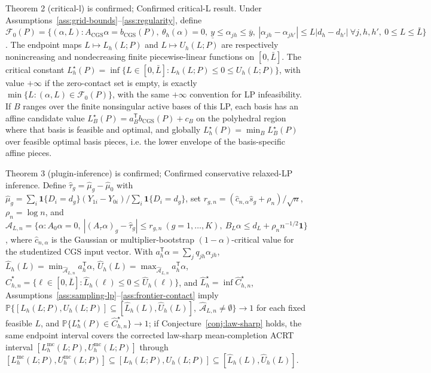 \documentclass[11pt]{article}
\renewcommand{\Pr}{\mathbb{P}}
\newcommand{\one}{\mathbf{1}}
\newcommand{\transpose}{\mathsf{T}}
\theoremstyle{definition}
\theoremstyle{plain}
\theoremstyle{remark}
\begin{document}
Theorem 2 (critical-l) is confirmed; Confirmed critical-L result. Under Assumptions~\ref{ass:grid-bounds}--\ref{ass:regularity}, define \(\mathcal F_0(P)=\{(\alpha,L):A_{\mathrm{CGS}}\alpha=b_{\mathrm{CGS}}(P),\ \theta_h(\alpha)=0,\ \underline y\le\alpha_{jh}\le\overline y,\ |\alpha_{j h}-\alpha_{j h'}|\le L|d_h-d_{h'}|\ \forall j,h,h',\ 0\le L\le\bar L\}\). The endpoint maps \(L\mapsto L_h(L;P)\) and \(L\mapsto U_h(L;P)\) are respectively nonincreasing and nondecreasing finite piecewise-linear functions on \([0,\bar L]\). The critical constant \(L_h^\star(P)=\inf\{L\in[0,\bar L]:L_h(L;P)\le0\le U_h(L;P)\}\), with value \(+\infty\) if the zero-contact set is empty, is exactly \(\min\{L:(\alpha,L)\in\mathcal F_0(P)\}\), with the same \(+\infty\) convention for LP infeasibility. If \(B\) ranges over the finite nonsingular active bases of this LP, each basis has an affine candidate value \(L_B^\star(P)=a_B^\transpose b_{\mathrm{CGS}}(P)+c_B\) on the polyhedral region where that basis is feasible and optimal, and globally \(L_h^\star(P)=\min_B L_B^\star(P)\) over feasible optimal basis pieces, i.e. the lower envelope of the basis-specific affine pieces.

Theorem 3 (plugin-inference) is confirmed; Confirmed conservative relaxed-LP inference. Define \(\widehat\tau_g=\widehat\mu_g-\widehat\mu_0\) with \(\widehat\mu_g=\sum_i\one\{D_i=d_g\}(Y_{1i}-Y_{0i})/\sum_i\one\{D_i=d_g\}\), set \(r_{g,n}=(\widehat c_{n,\alpha}\widehat s_g+\rho_n)/\sqrt n\), \(\rho_n=\log n\), and \(\widehat{\mathcal A}_{L,n}=\{\alpha:A_0\alpha=0,\ |(A_\tau\alpha)_g-\widehat\tau_g|\le r_{g,n}\ (g=1,\ldots,K),\ B_L\alpha\le d_L+\rho_n n^{-1/2}\one\}\), where \(\widehat c_{n,\alpha}\) is the Gaussian or multiplier-bootstrap \((1-\alpha)\)-critical value for the studentized CGS input vector. With \(a_h^\transpose\alpha=\sum_jq_{jh}\alpha_{jh}\), \(\widehat L_h(L)=\min_{\widehat{\mathcal A}_{L,n}}a_h^\transpose\alpha\), \(\widehat U_h(L)=\max_{\widehat{\mathcal A}_{L,n}}a_h^\transpose\alpha\), \(\widehat C_{h,n}^\star=\{\ell\in[0,\bar L]:\widehat L_h(\ell)\le0\le\widehat U_h(\ell)\}\), and \(\widehat L_h^\star=\inf\widehat C_{h,n}^\star\), Assumptions~\ref{ass:sampling-lp}--\ref{ass:frontier-contact} imply \(\Pr\{[L_h(L;P),U_h(L;P)]\subseteq[\widehat L_h(L),\widehat U_h(L)],\ \widehat{\mathcal A}_{L,n}\ne\emptyset\}\to1\) for each fixed feasible \(L\), and \(\Pr\{L_h^\star(P)\in\widehat C_{h,n}^\star\}\to1\); if Conjecture~\ref{conj:law-sharp} holds, the same endpoint interval covers the corrected law-sharp mean-completion ACRT interval \([L_h^{\mathrm{mc}}(L;P),U_h^{\mathrm{mc}}(L;P)]\) through \([L_h^{\mathrm{mc}}(L;P),U_h^{\mathrm{mc}}(L;P)]\subseteq[L_h(L;P),U_h(L;P)]\subseteq[\widehat L_h(L),\widehat U_h(L)]\).
\end{document}
